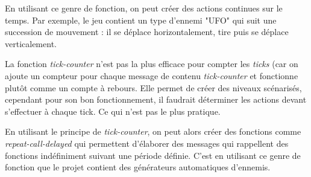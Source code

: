 \documentclass{article}
\begin{document}
En utilisant ce genre de fonction, on peut créer des actions continues sur le temps. Par exemple, le jeu contient un type d'ennemi "UFO" qui suit une succession de mouvement : il se déplace horizontalement, tire puis se déplace verticalement.

La fonction \textit{tick-counter} n'est pas la plus efficace pour compter les \textit{ticks} (car on ajoute un compteur pour chaque message de contenu \textit{tick-counter} et fonctionne plutôt comme un compte à rebours. Elle permet de créer des niveaux scénarisés, cependant pour son bon fonctionnement, il faudrait déterminer les actions devant s'effectuer à chaque tick. Ce qui n'est pas le plus pratique.

En utilisant le principe de \textit{tick-counter}, on peut alors créer des fonctions comme \textit{repeat-call-delayed} qui permettent d'élaborer des messages qui rappellent des fonctions indéfiniment suivant une période définie. C'est en utilisant ce genre de fonction que le projet contient des générateurs automatiques d'ennemis.
\end{document}
